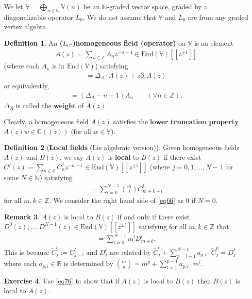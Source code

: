 \documentclass[12pt,a4paper,notitlepage]{article}
\theoremstyle{definition}
\newtheorem{df}{Definition}[section]
\newtheorem{exe}[df]{Exercise}
\newtheorem{rem}[df]{Remark}
\theoremstyle{plain}
\newcommand{\wtd}{\widetilde}
\newcommand{\End}{\mathrm{End}} %
\newcommand{\Vbb}{\mathbb V}
\newcommand{\Cbb}{\mathbb C}
\newcommand{\Nbb}{\mathbb N}
\newcommand{\Zbb}{\mathbb Z}
\newcommand{\Rbb}{\mathbb R}
\numberwithin{equation}{section}
\begin{document}
We let $\Vbb=\bigoplus_{n\in\Nbb}\Vbb(n)$ be an $\Nbb$-graded vector space, graded by a diagonalizable operator $L_0$. We do not assume that $\Vbb$ and $L_0$ are  from any graded vertex algebra. 
\begin{df}\label{lb61}
An \textbf{($L_0$-)homogeneous field (operator)} on $\Vbb$ is an element
\begin{align*}
A(z)=\sum_{n\in\Zbb} A_nz^{-n-1}\in\End(\Vbb)[[z^{\pm1}]]	
\end{align*}
(where each $A_n$ is in $\End(\Vbb)$) satisfying
\begin{align}
[L_0,A(z)]=\Delta_A\cdot A(z)+z\partial_z A(z)	
\end{align}
or equivalently,
\begin{align}
[L_0,A_n]=(\Delta_A-n-1)A_n\qquad(\forall n\in\Zbb)	.
\end{align}
$\Delta_A$ is called the \textbf{weight} of $A(z)$.
\end{df}


Clearly, a homogeneous field $A(z)$ satisfies the \textbf{lower truncation property} $A(z)w\in\Cbb((z))$ (for all $w\in\Vbb$).


\begin{df}[\textbf{Local fields} (Lie algebraic version)]\label{lb59}
Given homogeneous fields $A(z)$ and $B(z)$, we say $A(z)$ is  \textbf{local} to $B(z)$ if there exist $C^j(z)=\sum_{n\in\Zbb}C^j_nz^{-n-1}\in\End(\Vbb)[[z^{\pm1}]]$ (where $j=0,1,\dots,N-1$ for some $N\in\Nbb$) satisfying
\begin{align}
[A_m,B_k]=\sum_{l=0}^{N-1}{m\choose l}C^l_{m+k-l}	\label{eq66}
\end{align}
for all $m,k\in\Zbb$.  We consider the right hand side of \eqref{eq66} as $0$ if $N=0$.
\end{df}


\begin{rem}\label{lb60}
$A(z)$ is local to $B(z)$ if and only if there exist $D^0(z),\dots,D^{N-1}(z)\in\End(\Vbb)[[z^{\pm1}]]$ satisfying for all $m,k\in\Zbb$ that
\begin{align}
[A_m,B_k]=\sum_{l=0}^{N-1}m^lD^l_{m+k}.	\label{eq76}
\end{align}
This is because $\wtd C^l_j:=C^l_{j-l}$ and $D^l_j$ are related by   $\wtd C^l_j+\sum_{p=l+1}^{N-1}a_{p,l}\cdot\wtd C^{p}_j=D^l_j$ where each $a_{p,l}\in\Rbb$ is determined by ${m\choose p}=m^p+\sum_{l=1}^{p-1}a_{p,l}\cdot m^{l}$.
\end{rem}

\begin{exe}
Use \eqref{eq76} to show that if $A(z)$ is local to $B(z)$ then $B(z)$ is local to $A(z)$.
\end{exe}
\end{document}
